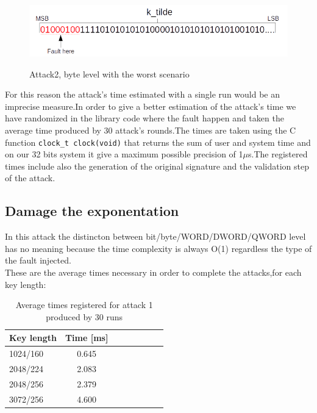 \documentclass[11pt,english]{article}
\begin{document}
\begin{figure}[H]
\includegraphics[width=1.0\textwidth]{img/attack2byteworst.png} \\
\caption{\label{f_etichetta}Attack2, byte level with the worst scenario }
\end{figure}

For this reason the attack's time estimated with a single run would be an imprecise measure.In order to give a better estimation of the attack's time we have randomized in the library code where the fault happen and taken the average time produced by 30 attack's rounds.The times are taken using the C function \texttt{clock\_t clock(void)} that returns the sum of user and system time and on our 32 bits system it give a maximum possible precision of 1$\mu$s.The registered times include also the generation of the original signature and the validation step of the attack.

\subsection{Damage the exponentation}

In this attack the distincton between bit/byte/WORD/DWORD/QWORD level has no meaning because the time complexity is always O(1) regardless the type of the fault injected. 
\\
These are the average times necessary in order to complete the attacks,for each key length:


\begin{table}[H]
\caption{ Average times registered for attack 1 produced by 30 runs}
\begin{center}
\begin{tabular}{l*{6}{c}r}
Key length        & Time [ms] \\
\hline
1024/160 &       0.645  \\
2048/224 &       2.083  \\
2048/256 &       2.379  \\
3072/256 &       4.600  \\ 
\end{tabular}
\end{center}
\end{table}
\end{document}
